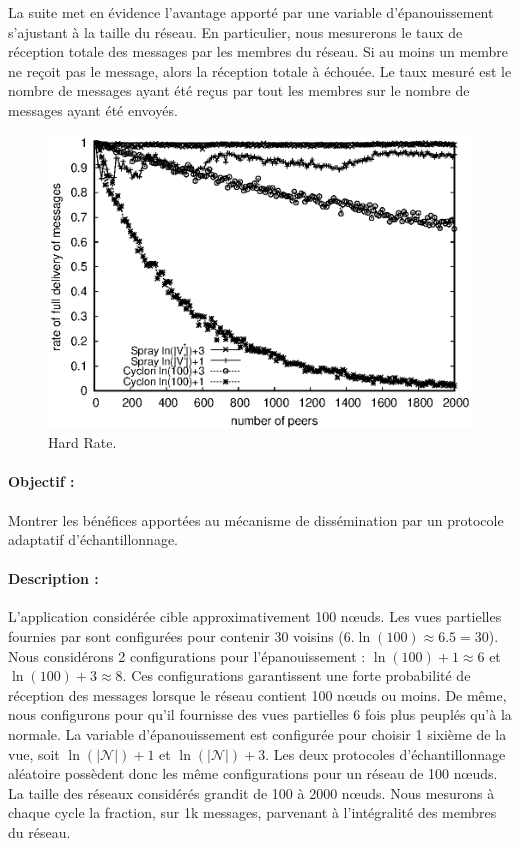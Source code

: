 La suite met en évidence l'avantage apporté par une variable d'épanouissement
s'ajustant à la taille du réseau. En particulier, nous mesurerons le taux de
réception totale des messages par les membres du réseau. Si au moins un membre
ne reçoit pas le message, alors la réception totale à échouée. Le taux mesuré
est le nombre de messages ayant été reçus par tout les membres sur le nombre de
messages ayant été envoyés.

\begin{figure}
  \begin{center}
    \includegraphics[width=.8\textwidth]{img/spray/hardrate.eps}
    \caption[Hard Rate]{\label{net:fig:hardrate} Hard Rate.}
  \end{center}
\end{figure}


\paragraph{Objectif :} Montrer les bénéfices apportées au mécanisme de
dissémination par un protocole adaptatif d'échantillonnage.
\paragraph{Description :} L'application considérée cible approximativement 100
nœuds. Les vues partielles fournies par \CYCLON sont configurées pour contenir
30 voisins ($6.\ln(100) \approx 6.5 = 30$). Nous considérons 2 configurations
pour l'épanouissement : $\ln(100)+1 \approx 6$ et $\ln(100)+3 \approx 8$. Ces
configurations garantissent une forte probabilité de réception des messages
lorsque le réseau contient 100 nœuds ou moins. De même, nous configurons \SPRAY
pour qu'il fournisse des vues partielles 6 fois plus peuplés qu'à la normale. La
variable d'épanouissement est configurée pour choisir 1 sixième de la vue, soit
$\ln(|\mathcal{N}|)+1$ et $\ln(|\mathcal{N}|)+3$.  Les deux protocoles
d'échantillonnage aléatoire possèdent donc les même configurations pour un
réseau de 100 nœuds. La taille des réseaux considérés grandit de 100 à 2000
nœuds. Nous mesurons à chaque cycle la fraction, sur 1k messages, parvenant à
l'intégralité des membres du réseau.
